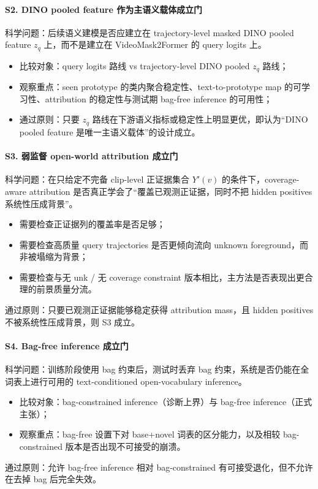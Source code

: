 \documentclass[UTF8]{ctexart}
\begin{document}
\paragraph{S2. DINO pooled feature 作为主语义载体成立门}
科学问题：后续语义建模是否应建立在 trajectory-level masked DINO pooled feature $z_q$ 上，而不是建立在 VideoMask2Former 的 query logits 上。
\begin{itemize}
\item 比较对象：query logits 路线 vs trajectory-level DINO pooled $z_q$ 路线；
\item 观察重点：seen prototype 的类内聚合稳定性、text-to-prototype map 的可学习性、attribution 的稳定性与测试期 bag-free inference 的可用性；
\item 通过原则：只要 $z_q$ 路线在下游语义指标或稳定性上明显更优，即认为“DINO pooled feature 是唯一主语义载体”的设计成立。
\end{itemize}

\paragraph{S3. 弱监督 open-world attribution 成立门}
科学问题：在只给定不完备 clip-level 正证据集合 $Y'(v)$ 的条件下，coverage-aware attribution 是否真正学会了“覆盖已观测正证据，同时不把 hidden positives 系统性压成背景”。
\begin{itemize}
\item 需要检查正证据列的覆盖率是否足够；
\item 需要检查高质量 query trajectories 是否更倾向流向 unknown foreground，而非被塌缩为背景；
\item 需要检查与无 unk / 无 coverage constraint 版本相比，主方法是否表现出更合理的前景质量分流。
\end{itemize}
通过原则：只要已观测正证据能够稳定获得 attribution mass，且 hidden positives 不被系统性压成背景，则 S3 成立。

\paragraph{S4. Bag-free inference 成立门}
科学问题：训练阶段使用 bag 约束后，测试时丢弃 bag 约束，系统是否仍能在全词表上进行可用的 text-conditioned open-vocabulary inference。
\begin{itemize}
\item 比较对象：bag-constrained inference（诊断上界）与 bag-free inference（正式主张）；
\item 观察重点：bag-free 设置下对 base+novel 词表的区分能力，以及相较 bag-constrained 版本是否出现不可接受的崩溃。
\end{itemize}
通过原则：允许 bag-free inference 相对 bag-constrained 有可接受退化，但不允许在去掉 bag 后完全失效。
\end{document}

